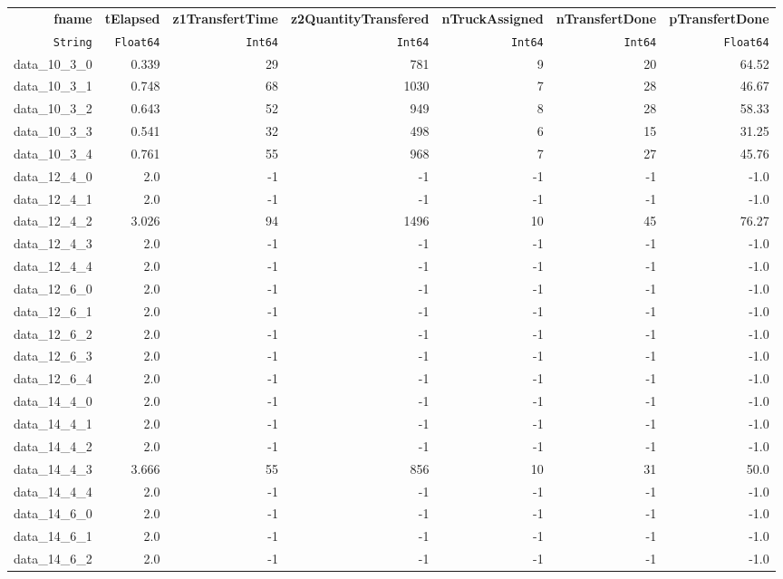 \begin{tabular}{rrrrrrr}
  \hline
  \textbf{fname} & \textbf{tElapsed} & \textbf{z1TransfertTime} & \textbf{z2QuantityTransfered} & \textbf{nTruckAssigned} & \textbf{nTransfertDone} & \textbf{pTransfertDone} \\
  \texttt{String} & \texttt{Float64} & \texttt{Int64} & \texttt{Int64} & \texttt{Int64} & \texttt{Int64} & \texttt{Float64} \\\hline
  data\_10\_3\_0 & 0.339 & 29 & 781 & 9 & 20 & 64.52 \\
  data\_10\_3\_1 & 0.748 & 68 & 1030 & 7 & 28 & 46.67 \\
  data\_10\_3\_2 & 0.643 & 52 & 949 & 8 & 28 & 58.33 \\
  data\_10\_3\_3 & 0.541 & 32 & 498 & 6 & 15 & 31.25 \\
  data\_10\_3\_4 & 0.761 & 55 & 968 & 7 & 27 & 45.76 \\
  data\_12\_4\_0 & 2.0 & -1 & -1 & -1 & -1 & -1.0 \\
  data\_12\_4\_1 & 2.0 & -1 & -1 & -1 & -1 & -1.0 \\
  data\_12\_4\_2 & 3.026 & 94 & 1496 & 10 & 45 & 76.27 \\
  data\_12\_4\_3 & 2.0 & -1 & -1 & -1 & -1 & -1.0 \\
  data\_12\_4\_4 & 2.0 & -1 & -1 & -1 & -1 & -1.0 \\
  data\_12\_6\_0 & 2.0 & -1 & -1 & -1 & -1 & -1.0 \\
  data\_12\_6\_1 & 2.0 & -1 & -1 & -1 & -1 & -1.0 \\
  data\_12\_6\_2 & 2.0 & -1 & -1 & -1 & -1 & -1.0 \\
  data\_12\_6\_3 & 2.0 & -1 & -1 & -1 & -1 & -1.0 \\
  data\_12\_6\_4 & 2.0 & -1 & -1 & -1 & -1 & -1.0 \\
  data\_14\_4\_0 & 2.0 & -1 & -1 & -1 & -1 & -1.0 \\
  data\_14\_4\_1 & 2.0 & -1 & -1 & -1 & -1 & -1.0 \\
  data\_14\_4\_2 & 2.0 & -1 & -1 & -1 & -1 & -1.0 \\
  data\_14\_4\_3 & 3.666 & 55 & 856 & 10 & 31 & 50.0 \\
  data\_14\_4\_4 & 2.0 & -1 & -1 & -1 & -1 & -1.0 \\
  data\_14\_6\_0 & 2.0 & -1 & -1 & -1 & -1 & -1.0 \\
  data\_14\_6\_1 & 2.0 & -1 & -1 & -1 & -1 & -1.0 \\
  data\_14\_6\_2 & 2.0 & -1 & -1 & -1 & -1 & -1.0 \\

\end{tabular}
